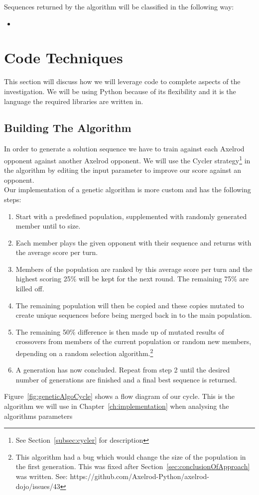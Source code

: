 Sequences returned by the algorithm will be classified in the following way:
\begin{itemize}
 \item
\end{itemize}

\section{Code Techniques}\label{sec:codeTechniques}
This section will discuss how we will leverage code to complete aspects of the investigation.
We will be using Python because of its flexibility and it is the language the required libraries are written in.

\subsection{Building The Algorithm}\label{subsec:buildingTheAlgorthem}
In order to generate a solution sequence we have to train against each Axelrod opponent against another Axelrod opponent.
We will use the Cycler strategy\footnote{See Section~\ref{subsec:cycler} for description} in the algorithm by editing the input parameter to improve our score against an opponent.\\


Our implementation of a genetic algorithm is more custom and has the following steps:
\begin{enumerate}
    \item Start with a predefined population, supplemented with randomly generated member until to size.
    \item Each member plays the given opponent with their sequence and returns with the average score per turn.
    \item Members of the population are ranked by this average score per turn and the highest scoring 25\% will be kept for the next round.
    The remaining 75\% are killed off.
    \item The remaining population will then be copied and these copies mutated to create unique sequences before being merged back in to the main population.
    \item The remaining 50\% difference is then made up of mutated results of crossovers from members of the current population or random new members, depending on a random selection algorithm.\footnote{This algorithm had a bug which would change the size of the population in the first generation.
    This was fixed after Section~\ref{sec:conclusionOfApproach} was written.
    See: https://github.com/Axelrod-Python/axelrod-dojo/issues/43}
    \item A generation has now concluded.
    Repeat from step 2 until the desired number of generations are finished and a final best sequence is returned.
\end{enumerate}
Figure~\ref{fig:geneticAlgoCycle} shows a flow diagram of our cycle.
This is the algorithm we will use in Chapter~\ref{ch:implementation} when analysing the algorithms parameters\\


